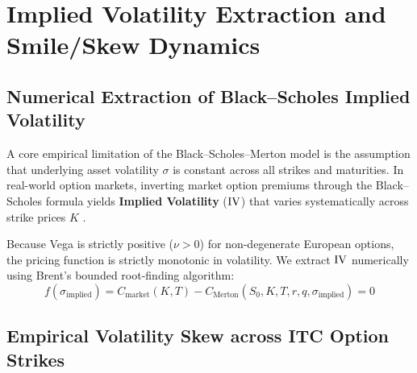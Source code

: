 
\section{Implied Volatility Extraction and Smile/Skew Dynamics}
\label{sec:volatility_skew}

\subsection{Numerical Extraction of Black--Scholes Implied Volatility}

A core empirical limitation of the Black--Scholes--Merton model is the assumption that underlying asset volatility $\sigma$ is constant across all strikes and maturities. In real-world option markets, inverting market option premiums through the Black--Scholes formula yields \textbf{Implied Volatility} ($\operatorname{IV}$) that varies systematically across strike prices $K$ \citep{dupire1994pricing}.

Because Vega is strictly positive ($\nu > 0$) for non-degenerate European options, the pricing function is strictly monotonic in volatility. We extract $\operatorname{IV}$ numerically using Brent's bounded root-finding algorithm:
\begin{equation}
    f(\sigma_{\text{implied}}) = C_{\text{market}}(K, T) - C_{\text{Merton}}(S_0, K, T, r, q, \sigma_{\text{implied}}) = 0
    \label{eq:brent_iv}
\end{equation}

\subsection{Empirical Volatility Skew across ITC Option Strikes}

